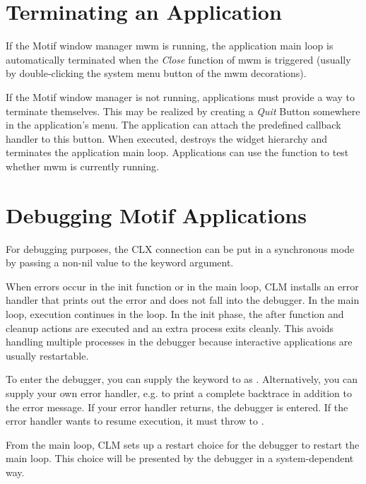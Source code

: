 \section{Terminating an Application}

If the Motif window manager mwm is running, the application main loop is
automatically terminated when the {\it Close} function of mwm is triggered
(usually by double-clicking the system menu button of the mwm decorations).

If the Motif window manager is not running, applications must provide a way to
terminate themselves.  This may be realized by creating a {\it Quit} Button
somewhere in the application's menu.  The application can attach the predefined
callback handler  to this button.  When executed,
 destroys the widget hierarchy and terminates the
application main loop.  Applications can use the function 
to test whether mwm is currently running. 

\section{Debugging Motif Applications}

For debugging purposes, the CLX connection can be put in a synchronous mode
by passing a non-nil value to the  keyword argument.

When errors occur in the init function or in the main loop, CLM installs an
error handler that prints out the error and does not fall into the debugger.
In the main loop, execution continues in the loop. In the init phase, the
after function and cleanup actions are executed and an extra process exits
cleanly. This avoids handling multiple processes in the debugger because
interactive applications are usually restartable.

To enter the debugger, you can supply the keyword  to
 as . Alternatively, you can supply
your own error handler, e.g. to print a complete backtrace in addition to
the error message. If your error handler returns, the debugger is entered.
If the error handler wants to resume execution, it must throw to
.

From the main loop, CLM sets up a restart choice for the debugger to restart
the main loop. This choice will be presented by the debugger in a
system-dependent way.
\pagebreak

